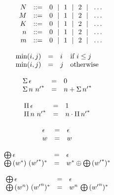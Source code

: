 $$
\begin{array}[t]{@{}lrrl@{}l@{}}
& N & ::= & 0 ~~|~~ 1 ~~|~~ 2 ~~|~~ \dots \\
& M & ::= & 0 ~~|~~ 1 ~~|~~ 2 ~~|~~ \dots \\
& K & ::= & 0 ~~|~~ 1 ~~|~~ 2 ~~|~~ \dots \\
& n & ::= & 0 ~~|~~ 1 ~~|~~ 2 ~~|~~ \dots \\
& m & ::= & 0 ~~|~~ 1 ~~|~~ 2 ~~|~~ \dots \\
\end{array}
$$

$$
\begin{array}[t]{@{}lcl@{}l@{}}
{\mathrm{min}}(i, j) & = & i & \quad \mbox{if}~ i \leq j \\
{\mathrm{min}}(i, j) & = & j & \quad \mbox{otherwise} \\
\end{array}
$$

$$
\begin{array}[t]{@{}lcl@{}l@{}}
{\Sigma}\, \epsilon & = & 0 \\
{\Sigma}\, n~{{n'}^\ast} & = & n + {\Sigma}\, {{n'}^\ast} \\
\end{array}
$$

$$
\begin{array}[t]{@{}lcl@{}l@{}}
{\Pi}\, \epsilon & = & 1 \\
{\Pi}\, n~{{n'}^\ast} & = & n \cdot {\Pi}\, {{n'}^\ast} \\
\end{array}
$$

\vspace{1ex}

$$
\begin{array}[t]{@{}lcl@{}l@{}}
\epsilon & = & \epsilon \\
w & = & w \\
\end{array}
$$

\vspace{1ex}

$$
\begin{array}[t]{@{}lcl@{}l@{}}
{\bigoplus}\, \epsilon & = & \epsilon \\
{\bigoplus}\, ({w^\ast})~{({{w'}^\ast})^\ast} & = & {w^\ast} \oplus {\bigoplus}\, {({{w'}^\ast})^\ast} \\
\end{array}
$$

$$
\begin{array}[t]{@{}lcl@{}l@{}}
{\bigoplus}\, \epsilon & = & \epsilon \\
{\bigoplus}\, ({w^{n}})~{({{w'}^{n}})^\ast} & = & {w^{n}}~{\bigoplus}\, {({{w'}^{n}})^\ast} \\
\end{array}
$$

